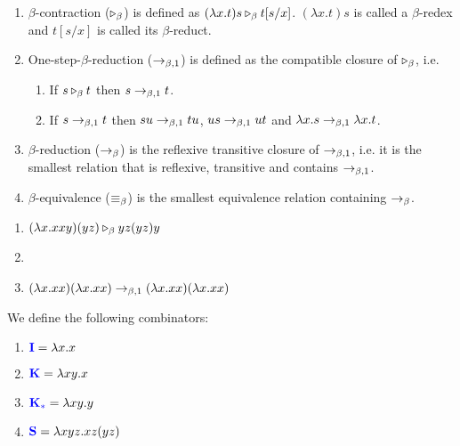 \begin{boxdefi}
    \hfill
    \begin{enumerate}
        \item \alert{$\beta$-contraction ($\triangleright_{\beta}$)} is defined as $(\lambda x. t) s \triangleright_{\beta} t [s/x]$. $(\lambda x. t) s$ is called a \alert{$\beta$-redex} and $t [s/x]$ is called its \alert{$\beta$-reduct}.
        \item {\alert{One-step-$\beta$-reduction ($\to_{\beta, 1}$)} is defined as the compatible closure of $\triangleright_{\beta}$, i.e.
            \begin{enumerate}
                \item If $s \triangleright_{\beta} t$ then $s \to_{\beta, 1} t$.
                \item If $s \to_{\beta, 1} t$ then $su \to_{\beta, 1} tu$, $us \to_{\beta, 1} ut$ and $\lambda x. s \to_{\beta, 1} \lambda x. t$.
            \end{enumerate}}
        \item \alert{$\beta$-reduction ($\to_{\beta}$)} is the reflexive transitive closure of $\to_{\beta, 1}$, i.e. it is the smallest relation that is reflexive, transitive and contains $\to_{\beta, 1}$.
        \item \alert{$\beta$-equivalence ($\equiv_{\beta}$)} is the smallest equivalence relation containing $\to_{\beta}$.
    \end{enumerate}
\end{boxdefi}

\begin{example}\label{ex:betared}
    \hfill
    \begin{enumerate}
        \item $(\lambda x. xxy)(yz) \triangleright_{\beta} yz(yz)y$
        \item {}
            \vspace{-2em}
        \item $(\lambda x.xx) (\lambda x. xx) \to_{\beta, 1} (\lambda x.xx) (\lambda x. xx)$
    \end{enumerate}
\end{example}

\begin{boxdefi}\label{defi:IKS}
    We define the following combinators:
    \begin{enumerate}
        \item $\alert{I} = \lambda x.x$
        \item $\alert{K} = \lambda xy.x$
        \item $\alert{K_*} = \lambda xy.y$
        \item $\alert{S} = \lambda xyz.xz(yz)$
    \end{enumerate}
\end{boxdefi}

